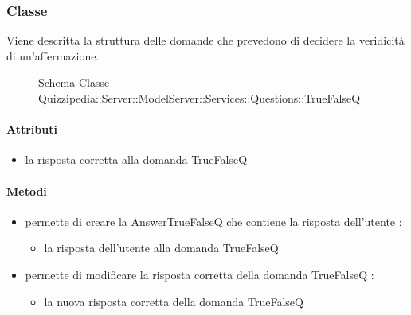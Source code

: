 \subsubsection{Classe }
Viene descritta la struttura delle domande che prevedono di decidere la veridicità di un'affermazione.
\begin{figure}[H]
\centering
\noindent{}
\caption[Schema Classe TrueFalseQ]{Schema Classe Quizzipedia::Server::ModelServer::Services::Questions::TrueFalseQ}
\end{figure}
\paragraph{Attributi}
\begin{itemize}
\item {}
\newline
la risposta corretta alla domanda TrueFalseQ
\end{itemize}
\paragraph{Metodi}
\begin{itemize}
\item {}
\newline
permette di creare la AnswerTrueFalseQ che contiene la risposta dell'utente
\newline
{} :
\begin{itemize}
\item {}
\newline
la risposta dell'utente alla domanda TrueFalseQ
\end{itemize}
\item {}
\newline
permette di modificare la risposta corretta della domanda TrueFalseQ
\newline
{} :
\begin{itemize}
\item {}
\newline
la nuova risposta corretta della domanda TrueFalseQ
\end{itemize}
\end{itemize}
